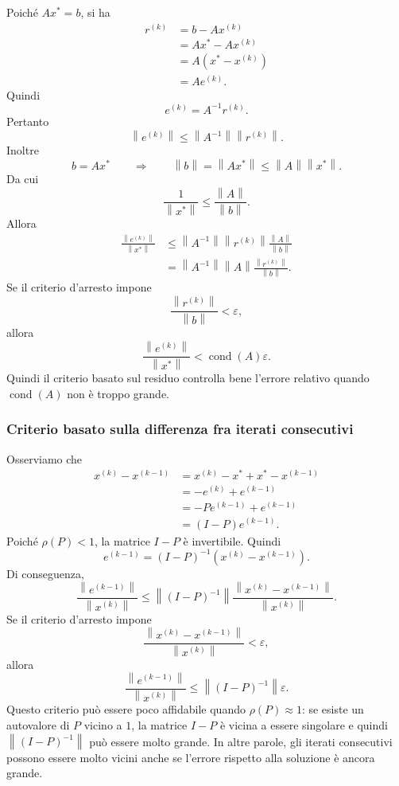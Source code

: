 \documentclass[a4paper]{article}
\newcommand{\norm}[1]{\left\lVert#1\right\rVert}
\begin{document}
Poiché \(Ax^\ast=b\), si ha
\begin{align*}
    r^{(k)}
    &= b-Ax^{(k)} \\
    &= Ax^\ast-Ax^{(k)} \\
    &= A\left(x^\ast-x^{(k)}\right) \\
    &= Ae^{(k)}.
\end{align*}
Quindi
\[
    e^{(k)}=A^{-1}r^{(k)}.
\]
Pertanto
\[
    \norm{e^{(k)}}
    \leq
    \norm{A^{-1}}\norm{r^{(k)}}.
\]
Inoltre
\[
    b=Ax^\ast
    \qquad\Longrightarrow\qquad
    \norm{b}
    =
    \norm{Ax^\ast}
    \leq
    \norm{A}\norm{x^\ast}.
\]
Da cui
\[
    \frac{1}{\norm{x^\ast}}
    \leq
    \frac{\norm{A}}{\norm{b}}.
\]
Allora
\begin{align*}
    \frac{\norm{e^{(k)}}}{\norm{x^\ast}}
    &\leq
    \norm{A^{-1}}\norm{r^{(k)}}\frac{\norm{A}}{\norm{b}} \\
    &=
    \norm{A^{-1}}\norm{A}\frac{\norm{r^{(k)}}}{\norm{b}}.
\end{align*}
Se il criterio d'arresto impone
\[
    \frac{\norm{r^{(k)}}}{\norm{b}}<\varepsilon,
\]
allora
\[
    \frac{\norm{e^{(k)}}}{\norm{x^\ast}}
    <
    \operatorname{cond}(A)\varepsilon.
\]
Quindi il criterio basato sul residuo controlla bene l'errore relativo quando \(\operatorname{cond}(A)\) non è troppo grande.

\subsubsection{Criterio basato sulla differenza fra iterati consecutivi}

Osserviamo che
\begin{align*}
    x^{(k)}-x^{(k-1)}
    &=
    x^{(k)}-x^\ast+x^\ast-x^{(k-1)} \\
    &=
    -e^{(k)}+e^{(k-1)} \\
    &=
    -Pe^{(k-1)}+e^{(k-1)} \\
    &=
    (I-P)e^{(k-1)}.
\end{align*}
Poiché \(\rho(P)<1\), la matrice \(I-P\) è invertibile. Quindi
\[
    e^{(k-1)}
    =
    (I-P)^{-1}\left(x^{(k)}-x^{(k-1)}\right).
\]
Di conseguenza,
\[
    \frac{\norm{e^{(k-1)}}}{\norm{x^{(k)}}}
    \leq
    \norm{(I-P)^{-1}}
    \frac{\norm{x^{(k)}-x^{(k-1)}}}{\norm{x^{(k)}}}.
\]
Se il criterio d'arresto impone
\[
    \frac{\norm{x^{(k)}-x^{(k-1)}}}{\norm{x^{(k)}}}<\varepsilon,
\]
allora
\[
    \frac{\norm{e^{(k-1)}}}{\norm{x^{(k)}}}
    \leq
    \norm{(I-P)^{-1}}\varepsilon.
\]
Questo criterio può essere poco affidabile quando \(\rho(P)\approx 1\): se esiste un autovalore di \(P\) vicino a \(1\), la matrice \(I-P\) è vicina a essere
singolare e quindi \(\norm{(I-P)^{-1}}\) può essere molto grande. In altre parole, gli iterati consecutivi possono
essere molto vicini anche se l'errore rispetto alla soluzione è ancora grande.
\end{document}
